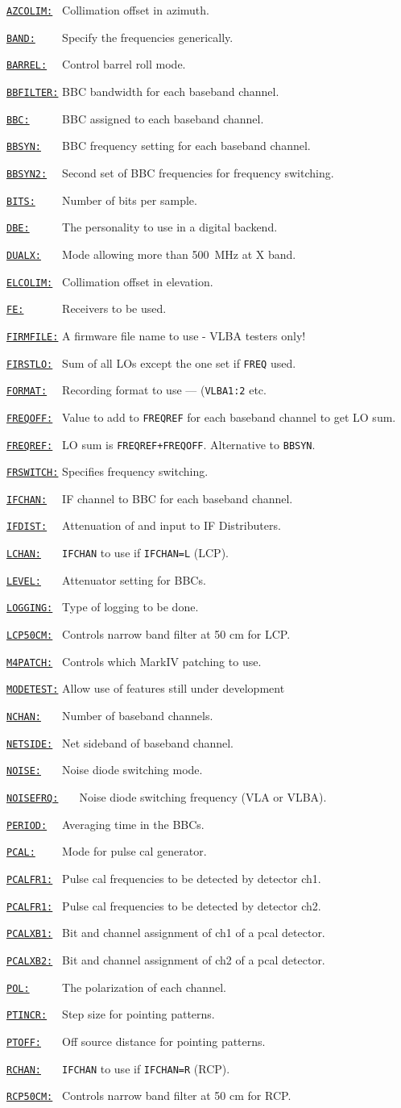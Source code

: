 \documentclass{report}
\newcommand{\htls}[2]%
{\item
  \hyperref[SP:#1]{{\tt #1:}}{\tt #2}%
}
\newcommand{\htlt}[3]%
{\item
  \hyperref[SP:#2]{{\tt #1:}}{\tt #3}%
}
\begin{document}
\begin{list}{~}{\parsep 0em  \itemsep 0em }
\htls{AZCOLIM}{~} Collimation offset in azimuth.
\htls{BAND}{~~~~} Specify the frequencies generically.
\htls{BARREL}{~~} Control barrel roll mode.
\htls{BBFILTER}{} BBC bandwidth for each baseband channel.
\htls{BBC}{~~~~~} BBC assigned to each baseband channel.
\htls{BBSYN}{~~~} BBC frequency setting for each baseband channel.
\htls{BBSYN2}{~~} Second set of BBC frequencies for frequency switching.
\htls{BITS}{~~~~} Number of bits per sample.
\htls{DBE}{~~~~~} The personality to use in a digital backend.
\htls{DUALX}{~~~} Mode allowing more than 500~MHz at X band.
\htls{ELCOLIM}{~} Collimation offset in elevation.
\htls{FE}{~~~~~~} Receivers to be used.
\htls{FIRMFILE}{} A firmware file name to use - VLBA testers only!
\htls{FIRSTLO}{~} Sum of all LOs except the one set if {\tt FREQ} used.
\htls{FORMAT}{~~} Recording format to use --- ({\tt VLBA1:2} etc.
\htls{FREQOFF}{~} Value to add to {\tt FREQREF} for each
                        baseband channel to get LO sum.
\htls{FREQREF}{~} LO sum is {\tt FREQREF+FREQOFF}. Alternative
                        to {\tt BBSYN}.
\htls{FRSWITCH}{} Specifies frequency switching.
\htls{IFCHAN}{~~} IF channel to BBC for each baseband channel.
\htls{IFDIST}{~~} Attenuation of and input to IF Distributers.
\htls{LCHAN}{~~~} {\tt IFCHAN} to use if {\tt IFCHAN=L} (LCP).
\htls{LEVEL}{~~~} Attenuator setting for BBCs.
\htls{LOGGING}{~} Type of logging to be done.
\htls{LCP50CM}{~} Controls narrow band filter at 50 cm for LCP.
\htls{M4PATCH}{~} Controls which MarkIV patching to use.
\htls{MODETEST}{} Allow use of features still under development
\htls{NCHAN}{~~~} Number of baseband channels.
\htls{NETSIDE}{~} Net sideband of baseband channel.
\htls{NOISE}{~~~} Noise diode switching mode.
\htls{NOISEFRQ}{~~~} Noise diode switching frequency (VLA or VLBA).
\htls{PERIOD}{~~} Averaging time in the BBCs.
\htls{PCAL}{~~~~} Mode for pulse cal generator.
\htls{PCALFR1}{~} Pulse cal frequencies to be detected by detector ch1.
\htlt{PCALFR1}{PCALFR1}{~} Pulse cal frequencies to be detected by
                  detector ch2.
\htls{PCALXB1}{~} Bit and channel assignment of ch1 of a pcal detector.
\htlt{PCALXB2}{PCALXB1}{~} Bit and channel assignment of ch2 of a pcal
                  detector.
\htls{POL}{~~~~~} The polarization of each channel.
\htls{PTINCR}{~~} Step size for pointing patterns.
\htls{PTOFF}{~~~} Off source distance for pointing patterns.
\htlt{RCHAN}{LCHAN}{~~~} {\tt IFCHAN} to use if {\tt IFCHAN=R} (RCP).
\htlt{RCP50CM}{LCP50CM}{~} Controls narrow band filter at 50 cm for RCP.

\end{list}
\end{document}
